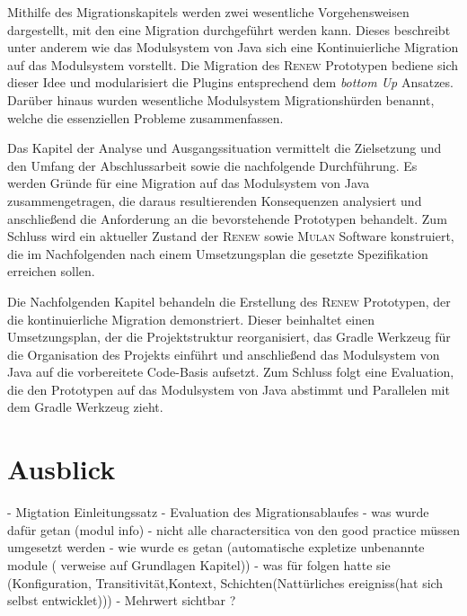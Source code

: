 Mithilfe des Migrationskapitels werden zwei wesentliche Vorgehensweisen dargestellt, mit den eine Migration durchgeführt werden kann. Dieses beschreibt unter anderem wie das Modulsystem von Java sich eine Kontinuierliche Migration auf das Modulsystem vorstellt. \newline
Die Migration des \textsc{Renew} Prototypen bediene sich dieser Idee und modularisiert die Plugins entsprechend dem \textit{bottom Up} Ansatzes. Darüber hinaus wurden wesentliche Modulsystem Migrationshürden benannt, welche die essenziellen Probleme zusammenfassen. \bigbreak

Das Kapitel der Analyse und Ausgangssituation vermittelt die Zielsetzung und den Umfang der Abschlussarbeit sowie die nachfolgende Durchführung. Es werden Gründe für eine Migration auf das Modulsystem von Java zusammengetragen, die daraus resultierenden Konsequenzen analysiert und anschließend die Anforderung an die bevorstehende Prototypen behandelt. Zum Schluss wird ein aktueller Zustand der \textsc{Renew} sowie \textsc{Mulan} Software konstruiert, die im Nachfolgenden nach einem Umsetzungsplan die gesetzte Spezifikation erreichen sollen.\bigbreak

Die Nachfolgenden Kapitel behandeln die Erstellung des \textsc{Renew} Prototypen, der die kontinuierliche Migration demonstriert. Dieser beinhaltet einen Umsetzungsplan, der die Projektstruktur reorganisiert, das Gradle Werkzeug für die Organisation des Projekts einführt und anschließend das Modulsystem von Java auf die vorbereitete Code-Basis aufsetzt. Zum Schluss folgt eine Evaluation, die den Prototypen auf das Modulsystem von Java abstimmt und Parallelen mit dem Gradle Werkzeug zieht. 

\section{Ausblick} 




\newpage

- Migtation Einleitungssatz 
- Evaluation des Migrationsablaufes
	- was wurde dafür getan (modul info)
	-  nicht alle charactersitica von den good practice müssen umgesetzt werden
	- wie wurde es getan (automatische expletize unbenannte module ( verweise auf Grundlagen Kapitel))
	- was für folgen hatte sie (Konfiguration, Transitivität,Kontext, Schichten(Nattürliches ereigniss(hat sich selbst entwicklet)))
	- Mehrwert  sichtbar ?



